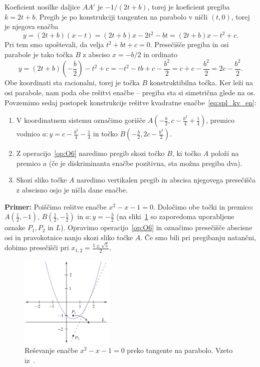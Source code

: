 Koeficient nosilke daljice $AA'$ je $ - 1/(2t + b)$, torej je koeficient pregiba $k = 2t + b$. Pregib je po konstrukciji tangenten na parabolo v ničli $(t, 0)$, torej je njegova enačba
$$ y = (2t + b)(x - t) = (2t + b)x - 2t^2 - bt = (2t + b)x - t^2 + c. $$
Pri tem smo upoštevali, da velja $t^2 + bt + c = 0$. Presečišče pregiba in osi parabole je tako točka $B$ z absciso $ x = -b/2 $ in ordinato
$$ y = (2t + b)\left(-\frac{b}{2}\right) - t^2 + c = - t^2 - tb + c - \frac{b^2}{2} = c + c - \frac{b^2}{2} = 2c - \frac{b^2}{2}.$$
Obe koordinati sta racionalni, torej je točka $B$ konstruktibilna točka. Ker leži na osi parabole, nam poda obe rešitvi enačbe -- pregiba sta si simetrična glede na os. Povzemimo sedaj postopek konstrukcije rešitve kvadratne enačbe~\ref{eq:spl_kv_en}:
\begin{enumerate}
    \item V koordinatnem sistemu označimo gorišče $A\left(-\frac{b}{2}, c - \frac{b^2}{4} + \frac{1}{4}\right)$, premico vodnico $a: y = c - \frac{b^2}{4} - \frac{1}{4}$ in točko $B(-\frac{b}{2}, 2c - \frac{b^2}{2})$.
    \item Z operacijo~\ref{op:O6} naredimo pregib skozi točko $B$, ki točko $A$ položi na premico $a$ (če je diskriminanta enačbe pozitivna, sta možna pregiba dva).
    \item Skozi sliko točke $A$ naredimo vertikalen pregib in abscisa njegovega presečišča z abscisno osjo je ničla dane enačbe.
\end{enumerate}

\textbf{Primer:} Poiščimo rešitve enačbe $x^2 - x - 1 = 0$. Določimo obe točki in premico: $A(\frac{1}{2}, -1)$, $B(\frac{1}{2}, -\frac{5}{2})$ in $a: y = -\frac{3}{2}$ (na sliki~\ref{fig:par_primer_hull} so zaporedoma uporabljene oznake $P_1, P_2$ in $L$). Opravimo operacijo~\ref{op:O6} in označimo presečišče abscisne osi in pravokotnice nanjo skozi sliko točke $A$. Če smo bili pri pregibanju natančni, dobimo presečišči pri $x_{1,2} = \frac{1 \pm \sqrt{5}}{2}$.

\begin{figure}[h]
    \centering
    \includegraphics[width=0.4\textwidth]{images/kvadratna_enacba/primer_hull.png}
    \caption[Primer reševanja kvadratne enačbe]{Reševanje enačbe $x^2 - x - 1 = 0$ preko tangente na parabolo. Vzeto iz~\cite[str.\ 37]{hull2020}.}
    \label{fig:par_primer_hull}
\end{figure}

